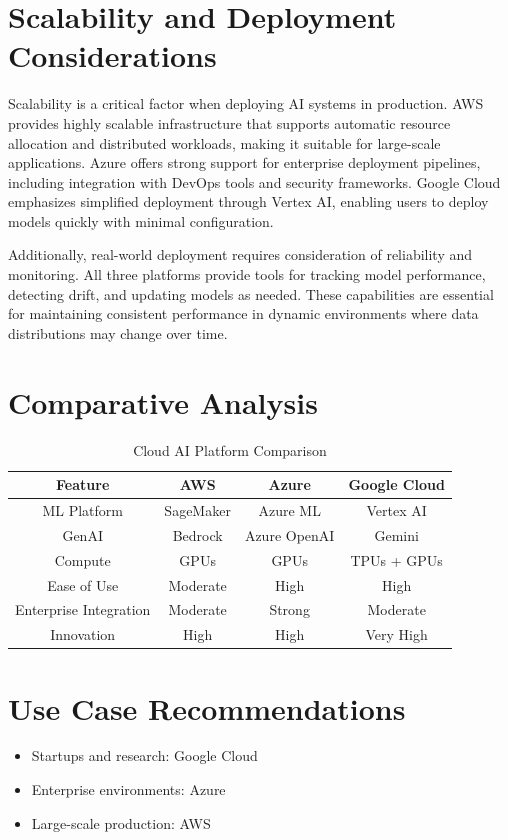 \documentclass[conference]{IEEEtran}
\begin{document}
	\section{Scalability and Deployment Considerations}
	Scalability is a critical factor when deploying AI systems in production. AWS provides highly scalable infrastructure that supports automatic resource allocation and distributed workloads, making it suitable for large-scale applications. Azure offers strong support for enterprise deployment pipelines, including integration with DevOps tools and security frameworks. Google Cloud emphasizes simplified deployment through Vertex AI, enabling users to deploy models quickly with minimal configuration.
	
	Additionally, real-world deployment requires consideration of reliability and monitoring. All three platforms provide tools for tracking model performance, detecting drift, and updating models as needed. These capabilities are essential for maintaining consistent performance in dynamic environments where data distributions may change over time.
	
	\section{Comparative Analysis}
	
	\begin{table}[h]
		\centering
		\caption{Cloud AI Platform Comparison}
		\begin{tabular}{|c|c|c|c|}
			\hline
			Feature & AWS & Azure & Google Cloud \\
			\hline
			ML Platform & SageMaker & Azure ML & Vertex AI \\
			GenAI & Bedrock & Azure OpenAI & Gemini \\
			Compute & GPUs & GPUs & TPUs + GPUs \\
			Ease of Use & Moderate & High & High \\
			Enterprise Integration & Moderate & Strong & Moderate \\
			Innovation & High & High & Very High \\
			\hline
		\end{tabular}
	\end{table}
	
	\section{Use Case Recommendations}
	\begin{itemize}
		\item Startups and research: Google Cloud
		\item Enterprise environments: Azure
		\item Large-scale production: AWS
	\end{itemize}
	
\end{document}
